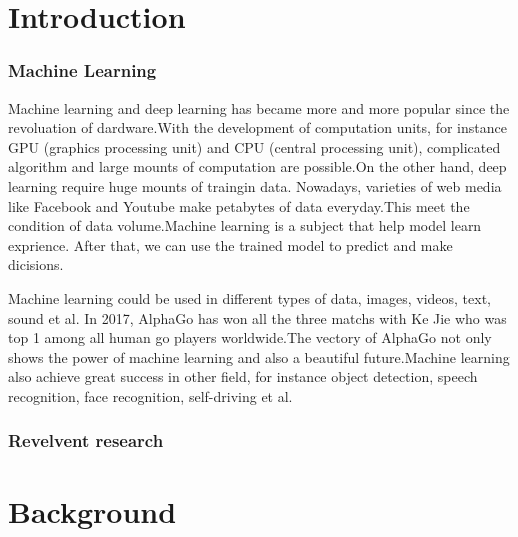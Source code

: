\documentclass[12pt,a4paper]{report}
\begin{document}
\newpage\null\thispagestyle{empty}\newpage
\newpage

\tableofcontents
\newpage

\newpage\null\thispagestyle{empty}\newpage
\newpage

\begin{appendix}
  \listoffigures

\end{appendix}

\newpage
\newpage\null\thispagestyle{empty}\newpage
\begin{appendix}
  \listoftables
\end{appendix}
\newpage\null\thispagestyle{empty}\newpage
{}
\section{Introduction}
\subsubsection{Machine Learning}
Machine learning and deep learning has became  more and more popular since the revoluation of dardware.With the development of computation units, for instance GPU (graphics processing unit) and CPU (central processing unit), complicated algorithm and large mounts of computation are  possible.On the other hand, deep learning require huge mounts of traingin data. Nowadays, varieties of web media like Facebook and Youtube make  petabytes of data everyday.This meet the  condition of data volume.Machine learning is a subject that help model   learn exprience. After that, we can use the trained model to predict and make dicisions.

Machine learning could be used in different types of data, images, videos, text, sound et al. In 2017, AlphaGo has won all the three matchs with Ke Jie who was top 1 among all human  go players worldwide.The vectory of AlphaGo not only shows the power of machine learning and also a beautiful future.Machine learning also achieve great success in other field, for instance object detection, speech recognition, face recognition, self-driving et al.
\subsubsection{Revelvent research}
\newpage
\section{Background}
\end{document}
